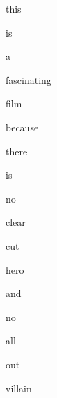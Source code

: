 \documentclass[varwidth]{standalone}
\begin{document}
\begin{CJK*}{UTF8}{gbsn}
{\setlength{\fboxsep}{0pt}\colorbox{white!0}{\parbox{0.8\textwidth}{
\colorbox{red!4.916347}{\strut this} \colorbox{blue!2.0631433}{\strut is} \colorbox{blue!0.3493431}{\strut a} \colorbox{blue!33.19824}{\strut fascinating} \colorbox{red!1.4569104}{\strut film} \colorbox{blue!5.9088373}{\strut because} \colorbox{red!3.065613}{\strut there} \colorbox{red!2.3782227}{\strut is} \colorbox{red!86.87165}{\strut no} \colorbox{red!5.1966734}{\strut clear} \colorbox{red!6.7440004}{\strut cut} \colorbox{blue!0.4221037}{\strut hero} \colorbox{red!0.30667293}{\strut and} \colorbox{red!22.927729}{\strut no} \colorbox{red!1.9039879}{\strut all} \colorbox{red!2.5470462}{\strut out} \colorbox{red!7.4542055}{\strut villain} 
}}}
\end{CJK*}
\end{document}
